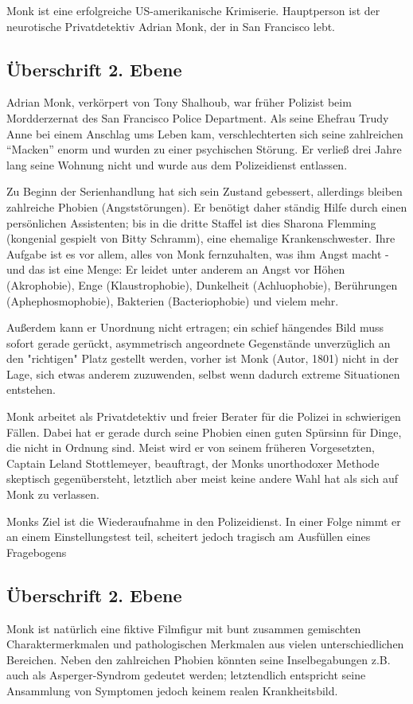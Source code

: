 Monk ist eine erfolgreiche US-amerikanische Krimiserie. Hauptperson ist der neurotische Privatdetektiv Adrian Monk, der in San Francisco lebt.

\subsection{Überschrift 2. Ebene}
\label{subsec:ueberschrift_zweiter_ebene_01}
Adrian Monk, verkörpert von Tony Shalhoub, war früher Polizist beim Mordderzernat des San Francisco Police Department. Als seine Ehefrau Trudy Anne bei einem Anschlag ums Leben kam, verschlechterten sich seine zahlreichen ``Macken'' enorm und wurden zu einer psychischen Störung. Er verließ drei Jahre lang seine Wohnung nicht und wurde aus dem Polizeidienst entlassen.

Zu Beginn der Serienhandlung hat sich sein Zustand gebessert, allerdings bleiben zahlreiche Phobien (Angststörungen). Er benötigt daher ständig Hilfe durch einen persönlichen Assistenten; bis in die dritte Staffel ist dies Sharona Flemming (kongenial gespielt von Bitty Schramm), eine ehemalige Krankenschwester. Ihre Aufgabe ist es vor allem, alles von Monk fernzuhalten, was ihm Angst macht - und das ist eine Menge: Er leidet unter anderem an Angst vor Höhen (Akrophobie), Enge (Klaustrophobie), Dunkelheit (Achluophobie), Berührungen (Aphephosmophobie), Bakterien (Bacteriophobie) und vielem mehr.

Außerdem kann er Unordnung nicht ertragen; ein schief hängendes Bild muss sofort gerade gerückt, asymmetrisch angeordnete Gegenstände unverzüglich an den "richtigen" Platz gestellt werden, vorher ist Monk (Autor, 1801) nicht in der Lage, sich etwas anderem zuzuwenden, selbst wenn dadurch extreme Situationen entstehen.

Monk arbeitet als Privatdetektiv und freier Berater für die Polizei in schwierigen Fällen. Dabei hat er gerade durch seine Phobien einen guten Spürsinn für Dinge, die nicht in Ordnung sind. Meist wird er von seinem früheren Vorgesetzten, Captain Leland Stottlemeyer, beauftragt, der Monks unorthodoxer Methode skeptisch gegenübersteht, letztlich aber meist keine andere Wahl hat als sich auf Monk zu verlassen.

Monks Ziel ist die Wiederaufnahme in den Polizeidienst. In einer Folge nimmt er an einem Einstellungstest teil, scheitert jedoch tragisch am Ausfüllen eines Fragebogens

\subsection{Überschrift  2. Ebene}
\label{subsec:ueberschrift_zweiter_ebene_02}
Monk ist natürlich eine fiktive Filmfigur mit bunt zusammen gemischten Charaktermerkmalen und pathologischen Merkmalen aus vielen unterschiedlichen Bereichen. Neben den zahlreichen Phobien könnten seine Inselbegabungen z.B. auch als Asperger-Syndrom gedeutet werden; letztendlich entspricht seine Ansammlung von Symptomen jedoch keinem realen Krankheitsbild.

